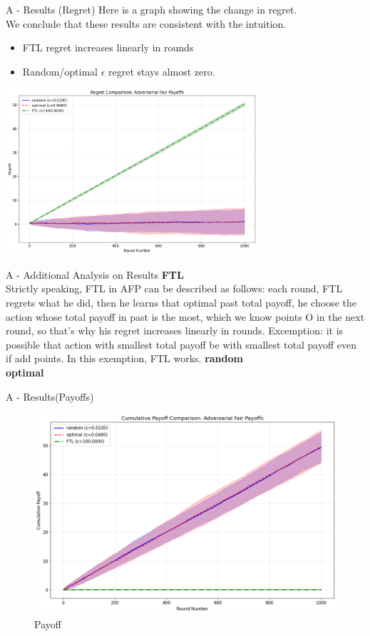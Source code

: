 \documentclass{beamer}
\begin{document}
\begin{frame}{A - Results (Regret)}
Here is a graph showing the change in regret. \\
We conclude that these results are consistent with the intuition.
\begin{itemize}
    \item FTL regret increases linearly in rounds
    \item Random/optimal $\epsilon$ regret stays almost zero.
\end{itemize}
\begin{center}
    \includegraphics[width=0.7\textwidth]{../figures/adversarial_regret_comparison.png}
\end{center}
\end{frame}

\begin{frame}{A - Additional Analysis on Results}
\textbf{FTL}\\
Strictly speaking, FTL in AFP can be described as follows:
each round, FTL regrets what he did, then he learns that optimal past total payoff, he choose the action whose total payoff in past is the most, which we know points O in the next round, so that's why his regret increases linearly in rounds.
Excemption: it is possible that action with smallest total payoff be with smallest total payoff even if add points. In this exemption, FTL works.
\textbf{random}\\

\textbf{optimal}\\

\end{frame}

\begin{frame}{A - Results(Payoffs)}

\begin{figure}
    \centering
    \includegraphics[width=0.5\linewidth]{figures/AFR_payoff.png}
    \caption{Payoff}
    \label{fig:placeholder}
\end{figure}

\end{frame}
\end{document}
